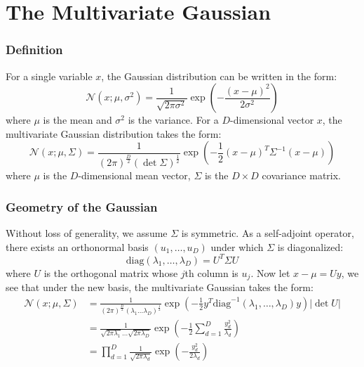 \documentclass{beamer}
\begin{document}
\section{The Multivariate Gaussian}

\begin{frame}
    \frametitle{Definition}
    For a single variable $x$, the Gaussian distribution can be written in the form:
    \begin{equation*}
        \mathcal{N}(x;\mu,\sigma^{2})=\frac{1}{\sqrt{2\pi\sigma^{2}}}\exp(-\frac{(x-\mu)^{2}}{2\sigma^{2}})
    \end{equation*}
    where $\mu$ is the mean and $\sigma^{2}$ is the variance. For a $D$-dimensional vector $x$, the multivariate Gaussian distribution takes the form:
    \begin{equation*}
        \mathcal{N}(x;\mu,\Sigma)=\frac{1}{(2\pi)^{\frac{D}{2}}(\det\Sigma)^{\frac{1}{2}}}\exp(-\frac{1}{2}(x-\mu)^{T}\Sigma^{-1}(x-\mu))
    \end{equation*}
    where $\mu$ is the $D$-dimensional mean vector, $\Sigma$ is the $D\times{}D$ covariance matrix.
\end{frame}

\begin{frame}
    \frametitle{Geometry of the Gaussian}
    Without loss of generality, we assume $\Sigma$ is symmetric. As a self-adjoint operator, there exists an orthonormal basis $(u_{1},\hdots,u_{D})$ under which $\Sigma$ is diagonalized:
    \begin{equation*}
        \mathrm{diag}(\lambda_{1},\hdots,\lambda_{D})=U^{T}\Sigma{}U
    \end{equation*}
    where $U$ is the orthogonal matrix whose $j$th column is $u_{j}$. Now let $x-\mu=Uy$, we see that under the new basis, the multivariate Gaussian takes the form:
    \begin{align*}
        \mathcal{N}(x;\mu,\Sigma)&=\frac{1}{(2\pi)^{\frac{D}{2}}(\lambda_{1}\hdots\lambda_{D})^{\frac{1}{2}}}\exp(-\frac{1}{2}y^{T}\mathrm{diag}^{-1}(\lambda_{1},\hdots,\lambda_{D})y)|\det{}U| \\
        &=\frac{1}{\sqrt{2\pi\lambda_{1}}\hdots\sqrt{2\pi\lambda_{D}}}\exp(-\frac{1}{2}\sum_{d=1}^{D}\frac{y_{d}^{2}}{\lambda_{d}}) \\
        &=\prod_{d=1}^{D}\frac{1}{\sqrt{2\pi\lambda_{d}}}\exp(-\frac{y_{d}^{2}}{2\lambda_{d}})
    \end{align*}
\end{frame}
\end{document}
